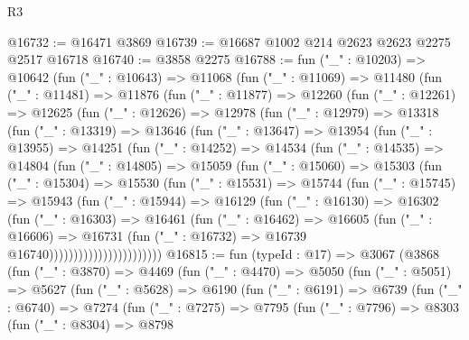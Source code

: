 \begin{lexlean}{R3}
\begin{coremodule}
@16732 := @16471 @3869
@16739 := @16687 @1002 @214 @2623 @2623 @2275 @2517 @16718
@16740 := @3858 @2275
@16788 := fun ("_" : @10203) =>
  @10642
    (fun ("_" : @10643) =>
    @11068
      (fun ("_" : @11069) =>
      @11480
        (fun ("_" : @11481) =>
        @11876
          (fun ("_" : @11877) =>
          @12260
            (fun ("_" : @12261) =>
            @12625
              (fun ("_" : @12626) =>
              @12978
                (fun ("_" : @12979) =>
                @13318
                  (fun ("_" : @13319) =>
                  @13646
                    (fun ("_" : @13647) =>
                    @13954
                      (fun ("_" : @13955) =>
                      @14251
                        (fun ("_" : @14252) =>
                        @14534
                          (fun ("_" : @14535) =>
                          @14804
                            (fun ("_" : @14805) =>
                            @15059
                              (fun ("_" : @15060) =>
                              @15303
                                (fun ("_" : @15304) =>
                                @15530
                                  (fun ("_" : @15531) =>
                                  @15744
                                    (fun ("_" : @15745) =>
                                    @15943
                                      (fun ("_" : @15944) =>
                                      @16129
                                        (fun ("_" : @16130) =>
                                        @16302
                                          (fun ("_" : @16303) =>
                                          @16461
                                            (fun ("_" : @16462) =>
                                            @16605
                                              (fun ("_" : @16606) =>
                                              @16731
                                                (fun ("_" : @16732) =>
                                                @16739 @16740)))))))))))))))))))))))
@16815 := fun (typeId : @17) =>
  @3067
    (@3868
      (fun ("_" : @3870) =>
      @4469
        (fun ("_" : @4470) =>
        @5050
          (fun ("_" : @5051) =>
          @5627
            (fun ("_" : @5628) =>
            @6190
              (fun ("_" : @6191) =>
              @6739
                (fun ("_" : @6740) =>
                @7274
                  (fun ("_" : @7275) =>
                  @7795
                    (fun ("_" : @7796) =>
                    @8303
                      (fun ("_" : @8304) =>
                      @8798

\end{coremodule}
\end{lexlean}
